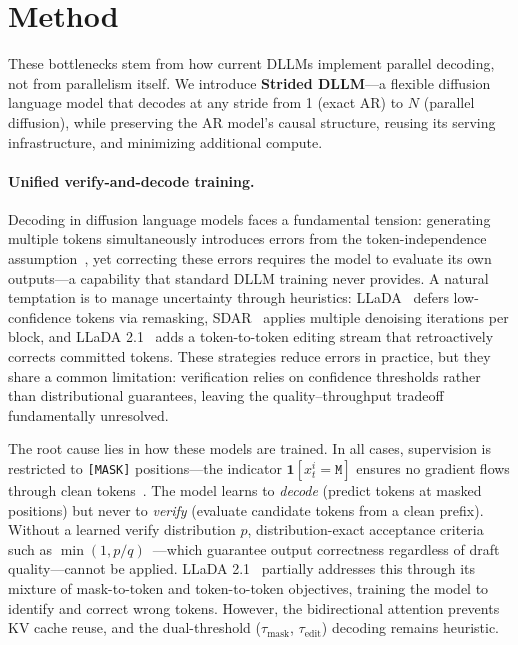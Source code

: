 \section{Method}
\label{sec:method}

These bottlenecks stem from how current DLLMs implement parallel decoding, not from parallelism itself. We introduce \textbf{Strided DLLM}---a flexible diffusion language model that decodes at any stride from 1 (exact AR) to $N$ (parallel diffusion), while preserving the AR model's causal structure, reusing its serving infrastructure, and minimizing additional compute.

\paragraph{Unified verify-and-decode training.}
Decoding in diffusion language models faces a fundamental tension: generating multiple tokens simultaneously introduces errors from the token-independence assumption~\citep{nie2024scalingmdlm}, yet correcting these errors requires the model to evaluate its own outputs---a capability that standard DLLM training never provides. A natural temptation is to manage uncertainty through heuristics: LLaDA~\citep{llada2025} defers low-confidence tokens via remasking, SDAR~\citep{sdar2025} applies multiple denoising iterations per block, and LLaDA 2.1~\citep{llada21_2025} adds a token-to-token editing stream that retroactively corrects committed tokens. These strategies reduce errors in practice, but they share a common limitation: verification relies on confidence thresholds rather than distributional guarantees, leaving the quality--throughput tradeoff fundamentally unresolved.

The root cause lies in how these models are trained. In all cases, supervision is restricted to \texttt{[MASK]} positions---the indicator $\mathbf{1}[x_t^i = \texttt{M}]$ ensures no gradient flows through clean tokens~\citep{llada2025}. The model learns to \emph{decode} (predict tokens at masked positions) but never to \emph{verify} (evaluate candidate tokens from a clean prefix). Without a learned verify distribution $p$, distribution-exact acceptance criteria such as $\min(1, p/q)$~\citep{leviathan2023speculative}---which guarantee output correctness regardless of draft quality---cannot be applied. LLaDA 2.1~\citep{llada21_2025} partially addresses this through its mixture of mask-to-token and token-to-token objectives, training the model to identify and correct wrong tokens. However, the bidirectional attention prevents KV cache reuse, and the dual-threshold ($\tau_\text{mask}$, $\tau_\text{edit}$) decoding remains heuristic.

